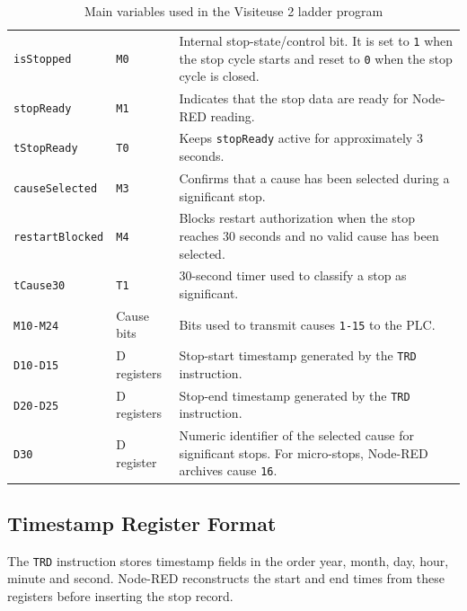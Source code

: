 \begin{table}[H]
\centering
\caption{Main variables used in the Visiteuse 2 ladder program}
\begin{tabularx}{\textwidth}{|P{0.22\textwidth}|P{0.20\textwidth}|Y|}
\hline
{}
 &  &  \\
\hline
\texttt{isStopped} & \texttt{M0} & Internal stop-state/control bit. It is set to \texttt{1} when the stop cycle starts and reset to \texttt{0} when the stop cycle is closed. \\
\hline
\texttt{stopReady} & \texttt{M1} & Indicates that the stop data are ready for Node-RED reading. \\
\hline
\texttt{tStopReady} & \texttt{T0} & Keeps \texttt{stopReady} active for approximately 3 seconds. \\
\hline
\texttt{causeSelected} & \texttt{M3} & Confirms that a cause has been selected during a significant stop. \\
\hline
\texttt{restartBlocked} & \texttt{M4} & Blocks restart authorization when the stop reaches 30 seconds and no valid cause has been selected. \\
\hline
\texttt{tCause30} & \texttt{T1} & 30-second timer used to classify a stop as significant. \\
\hline
\texttt{M10-M24} & Cause bits & Bits used to transmit causes \texttt{1-15} to the PLC. \\
\hline
\texttt{D10-D15} & D registers & Stop-start timestamp generated by the \texttt{TRD} instruction. \\
\hline
\texttt{D20-D25} & D registers & Stop-end timestamp generated by the \texttt{TRD} instruction. \\
\hline
\texttt{D30} & D register & Numeric identifier of the selected cause for significant stops. For micro-stops, Node-RED archives cause \texttt{16}. \\
\hline
\end{tabularx}
\end{table}

\subsection{Timestamp Register Format}
The \texttt{TRD} instruction stores timestamp fields in the order year, month, day, hour, minute and second. Node-RED reconstructs the start and end times from these registers before inserting the stop record.

